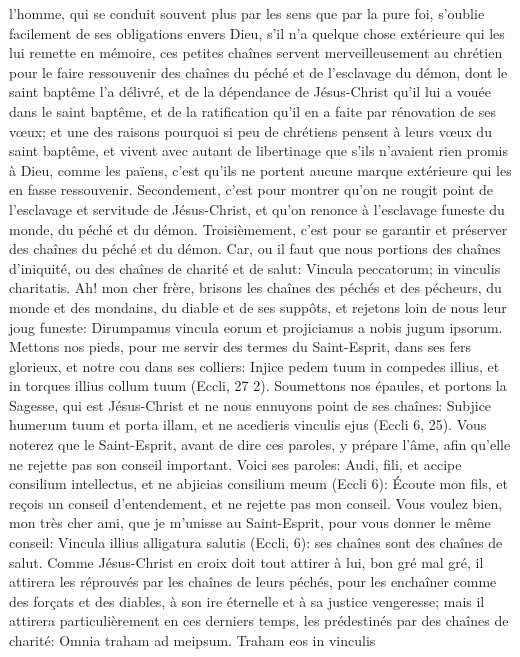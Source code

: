 l'homme, qui se conduit souvent plus par les sens que par la pure foi, s'oublie facilement de ses obligations envers
Dieu, s'il n'a quelque chose extérieure qui les lui remette en mémoire, ces petites chaînes servent
merveilleusement au chrétien pour le faire ressouvenir des chaînes du péché et de l'esclavage du démon, dont le
saint baptême l'a délivré, et de la dépendance de Jésus-Christ qu'il lui a vouée dans le saint baptême, et de la
ratification qu'il en a faite par rénovation de ses vœux; et une des raisons pourquoi si peu de chrétiens pensent à
leurs vœux du saint baptême, et vivent avec autant de libertinage que s'ils n'avaient rien promis à Dieu, comme
les païens, c'est qu'ils ne portent aucune marque extérieure qui les en fasse ressouvenir.
 Secondement, c'est pour montrer qu'on ne rougit point de l'esclavage et servitude de Jésus-Christ, et qu'on
renonce à l'esclavage funeste du monde, du péché et du démon.
Troisièmement, c'est pour se garantir et préserver des chaînes du péché et du démon. Car, ou il faut que nous
portions des chaînes d'iniquité, ou des chaînes de charité et de salut: Vincula peccatorum; in vinculis charitatis.
 Ah! mon cher frère, brisons les chaînes des péchés et des pécheurs, du monde et des mondains, du diable
et de ses suppôts, et rejetons loin de nous leur joug funeste: Dirumpamus vincula eorum et projiciamus a nobis
jugum ipsorum. Mettons nos pieds, pour me servir des termes du Saint-Esprit, dans ses fers glorieux, et notre cou
dans ses colliers: Injice pedem tuum in compedes illius, et in torques illius collum tuum (Eccli, 27 2). Soumettons
nos épaules, et portons la Sagesse, qui est Jésus-Christ et ne nous ennuyons point de ses chaînes: Subjice
humerum tuum et porta illam, et ne acedieris vinculis ejus (Eccli 6, 25). Vous noterez que le Saint-Esprit, avant de
dire ces paroles, y prépare l'âme, afin qu'elle ne rejette pas son conseil important. Voici ses paroles: Audi, fili, et
accipe consilium intellectus, et ne abjicias consilium meum (Eccli 6): Écoute mon fils, et reçois un conseil
d'entendement, et ne rejette pas mon conseil.
 Vous voulez bien, mon très cher ami, que je m'unisse au Saint-Esprit, pour vous donner le même conseil:
Vincula illius alligatura salutis (Eccli, 6): ses chaînes sont des chaînes de salut. Comme Jésus-Christ en croix doit
tout attirer à lui, bon gré mal gré, il attirera les réprouvés par les chaînes de leurs péchés, pour les enchaîner
comme des forçats et des diables, à son ire éternelle et à sa justice vengeresse; mais il attirera particulièrement en
ces derniers temps, les prédestinés par des chaînes de charité: Omnia traham ad meipsum. Traham eos in vinculis
